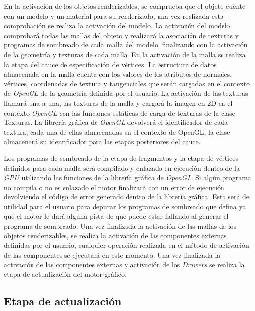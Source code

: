 \documentclass[a4paper]{book}
\begin{document}
En la activación de los objetos renderizables, se comprueba que el objeto cuente con un modelo y un material para su renderizado,
una vez realizada esta comprobación se realiza la activación del modelo. La activación del modelo comprobará todas las mallas del
objeto y realizará la asociación de texturas y programas de sombreado de cada malla del modelo, finalizando con la activación de la
geometría y texturas de cada malla. En la activación de la malla se realiza la etapa del cauce de especificación de vértices. La
estructura de datos almacenada en la malla cuenta con los valores de los atributos de normales, vértices, coordenadas de textura y
tangenciales que serán cargadas en el contexto de \textit{OpenGL} de la geometría definida por el usuario. La activación de las texturas
llamará una a una, las texturas de la malla y cargará la imagen en 2D en el contexto \textit{OpenGL} con las funciones estáticas de carga
de texturas de la clase Texturas. La librería gráfica de \textit{OpenGL} devolverá el identificador de cada textura, cada una de ellas
almacenadas en el contexto de OpenGL, la clase almacenará su identificador para las etapas posteriores del cauce.


Los programas de sombreado de la etapa de fragmentos y la etapa de vértices definidos para cada malla será compilado y enlazado en
ejecución dentro de la \textit{GPU} utilizando las funciones de la librería gráfica de \textit{OpenGL}. Si algún programa no compila o
no es enlazado el motor finalizará con un error de ejecución devolviendo el código de error generado dentro de la librería gráfica. Esto será de
utilidad para el usuario para depurar los programas de sombreado que defina ya que el motor le dará alguna pista de que puede estar
fallando al generar el programa de sombreado. Una vez finalizada la activación de las mallas de los objetos renderizables, se realiza la
activación de las componentes externas definidas por el usuario, cualquier operación realizada en el método de activación de las
componentes se ejecutará en este momento. Una vez finalizada la activación de las componentes externas y activación de los \textit{Drawers}
se realiza la etapa de actualización del motor gráfico.

\subsection{Etapa de actualización}
\label{subsec:actualizacion}
\end{document}
